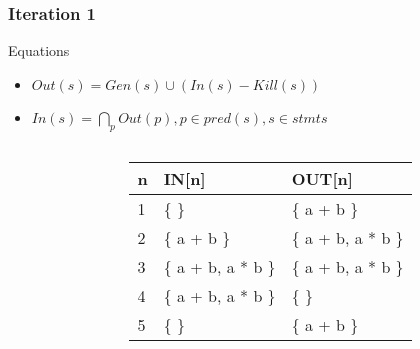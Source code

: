 \begin{frame}[fragile, t]
 \frametitle{Iteration 1} 

\begin{center}
\begin{scriptsize}
\begin{minipage}{8cm}
    \begin{block}{Equations}
    \begin{itemize}
        \item $Out(s) = Gen(s) \cup (In(s) - Kill(s))$  
	    \item $In(s) = \bigcap_p Out(p), p \in pred(s), s \in stmts$
    \end{itemize}
    \end{block}
\end{minipage}
\end{scriptsize}
\end{center}

\begin{columns}[T]
\begin{column}[T]{.5\textwidth}
    \vspace{0pt}
    
    \end{column}
    \begin{column}[T]{.5\textwidth}
\vspace{30pt}    
	\begin{scriptsize}
	   \begin{table}[]
\begin{tabular}{|l|l|l|}
\hline
n & IN{[}n{]} & OUT{[}n{]} \\ \hline
1  &  \{ \}               & \{ a + b \}        \pause \\ \hline
2  &  \{ a + b \}         & \{ a + b, a * b \} \pause \\ \hline
3  &  \{ a + b, a * b \}  & \{ a + b, a * b \} \pause \\ \hline
4  &  \{ a + b, a * b \}  & \{ \}              \pause \\ \hline
5  &  \{ \}               & \{ a + b \}        \\ \hline
\end{tabular}
\end{table}   
	\end{scriptsize}
	\end{column}
    
\end{columns}

\end{frame}


